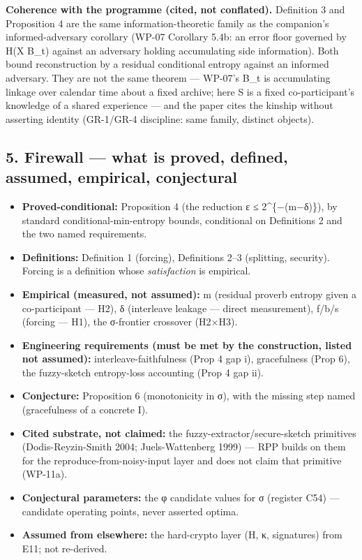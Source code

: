 \documentclass[
  11pt,
]{article}
\providecommand{\tightlist}{%
  \setlength{\itemsep}{0pt}\setlength{\parskip}{0pt}}
\begin{document}
\textbf{Coherence with the programme (cited, not conflated).} Definition
3 and Proposition 4 are the same information-theoretic family as the
companion's informed-adversary corollary (WP-07 Corollary 5.4b: an error
floor governed by H(X \textbar{} B\_t) against an adversary holding
accumulating side information). Both bound reconstruction by a residual
conditional entropy against an informed adversary. They are not the same
theorem --- WP-07's B\_t is accumulating linkage over calendar time
about a fixed archive; here S is a fixed co-participant's knowledge of a
shared experience --- and the paper cites the kinship without asserting
identity (GR-1/GR-4 discipline: same family, distinct objects).

\subsection{5. Firewall --- what is proved, defined, assumed, empirical,
conjectural}\label{firewall-what-is-proved-defined-assumed-empirical-conjectural}

\begin{itemize}
\tightlist
\item
  \textbf{Proved-conditional:} Proposition 4 (the reduction ε ≤
  2\^{}\{−(m−δ)\}), by standard conditional-min-entropy bounds,
  conditional on Definitions 2 and the two named requirements.
\item
  \textbf{Definitions:} Definition 1 (forcing), Definitions 2--3
  (splitting, security). Forcing is a definition whose
  \emph{satisfaction} is empirical.
\item
  \textbf{Empirical (measured, not assumed):} m (residual proverb
  entropy given a co-participant --- H2), δ (interleave leakage ---
  direct measurement), f/b/s (forcing --- H1), the σ-frontier crossover
  (H2×H3).
\item
  \textbf{Engineering requirements (must be met by the construction,
  listed not assumed):} interleave-faithfulness (Prop 4 gap i),
  gracefulness (Prop 6), the fuzzy-sketch entropy-loss accounting (Prop
  4 gap ii).
\item
  \textbf{Conjecture:} Proposition 6 (monotonicity in σ), with the
  missing step named (gracefulness of a concrete I).
\item
  \textbf{Cited substrate, not claimed:} the
  fuzzy-extractor/secure-sketch primitives (Dodis-Reyzin-Smith 2004;
  Juels-Wattenberg 1999) --- RPP builds on them for the
  reproduce-from-noisy-input layer and does not claim that primitive
  (WP-11a).
\item
  \textbf{Conjectural parameters:} the φ candidate values for σ
  (register C54) --- candidate operating points, never asserted optima.
\item
  \textbf{Assumed from elsewhere:} the hard-crypto layer (H, κ,
  signatures) from E11; not re-derived.
\end{itemize}
\end{document}
